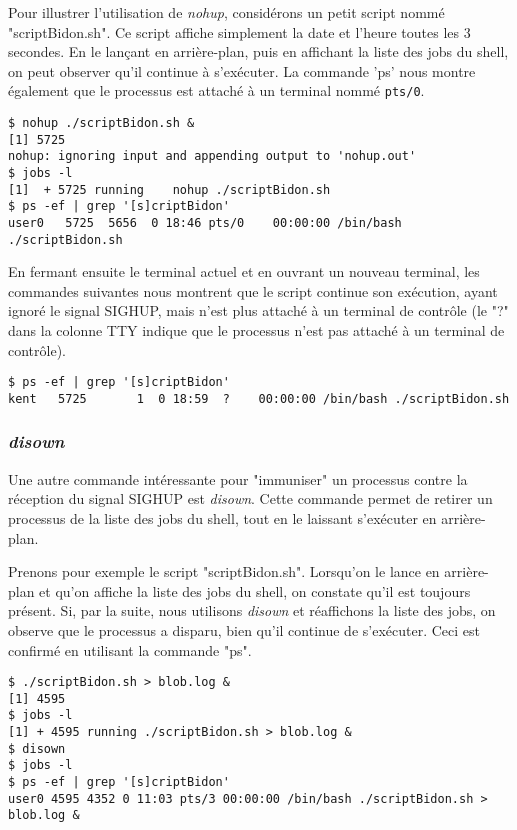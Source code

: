 Pour illustrer l'utilisation de \textit{nohup}, considérons un petit script nommé "scriptBidon.sh". Ce script affiche simplement la date et l'heure toutes les 3 secondes. En le lançant en arrière-plan, puis 
en affichant la liste des jobs du shell, on peut observer qu'il continue à s'exécuter. La commande 'ps' nous montre également que le processus est attaché à un terminal nommé \texttt{pts/0}.

\begin{lstlisting}
$ nohup ./scriptBidon.sh &
[1] 5725
nohup: ignoring input and appending output to 'nohup.out'                              
$ jobs -l
[1]  + 5725 running    nohup ./scriptBidon.sh
$ ps -ef | grep '[s]criptBidon'
user0   5725  5656  0 18:46 pts/0    00:00:00 /bin/bash ./scriptBidon.sh
\end{lstlisting}

En fermant ensuite le terminal actuel et en ouvrant un nouveau terminal, les commandes suivantes nous montrent que le script continue son exécution, ayant ignoré le signal SIGHUP,
mais n'est plus attaché à un terminal de contrôle (le "?" dans la colonne TTY indique que le processus n'est pas attaché à un terminal de contrôle).

\begin{lstlisting}
$ ps -ef | grep '[s]criptBidon'
kent   5725       1  0 18:59  ?    00:00:00 /bin/bash ./scriptBidon.sh
\end{lstlisting}

\subsubsection{\textit{disown}}

Une autre commande intéressante pour "immuniser" un processus contre la réception du signal SIGHUP est \textit{disown}. Cette commande permet de retirer un processus de la liste des jobs du shell,
tout en le laissant s'exécuter en arrière-plan.

Prenons pour exemple le script "scriptBidon.sh". Lorsqu'on le lance en arrière-plan et qu'on affiche la liste des jobs du shell, on constate qu'il est toujours présent. Si, par la suite,
nous utilisons \textit{disown} et réaffichons la liste des jobs, on observe que le processus a disparu, bien qu'il continue de s'exécuter. Ceci est confirmé en utilisant la commande "ps".

\begin{lstlisting}
$ ./scriptBidon.sh > blob.log &
[1] 4595
$ jobs -l
[1] + 4595 running ./scriptBidon.sh > blob.log &
$ disown
$ jobs -l
$ ps -ef | grep '[s]criptBidon'
user0 4595 4352 0 11:03 pts/3 00:00:00 /bin/bash ./scriptBidon.sh > blob.log &
\end{lstlisting}

